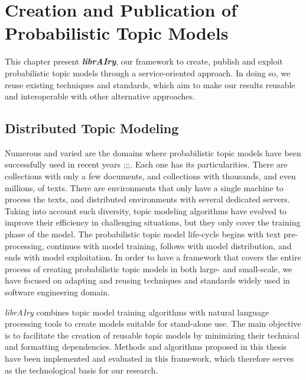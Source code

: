 

\chapter{Creation and Publication of Probabilistic Topic Models}\label{ch:scalability}

\graphicspath{{scalability/figures/}}


This chapter present \textit{\textbf{librAIry}}, our framework to create, publish and exploit probabilistic topic models through a service-oriented approach. In doing so, we reuse existing techniques and standards, which aim to make our results reusable and interoperable with other alternative approaches.


\section{Distributed Topic Modeling}


Numerous and varied are the domains where probabilistic topic models have been successfully used in recent years \citep{TapiNzali2017};\citep{ONeill2017};\citep{Greene2016};\citep{He2017}. Each one has its particularities. There are collections with only a few documents, and collections with thousands, and even millions, of texts. There are environments that only have a single machine to process the texts, and distributed environments with several dedicated servers. Taking into account such diversity, topic modeling algorithms have evolved to improve their efficiency in challenging situations, but they only cover the training phase of the model. The probabilistic topic model life-cycle begins with text pre-processing, continues with model training, follows with model distribution, and ends with model exploitation. In order to have a framework that covers the entire process of creating probabilistic topic models in both large- and small-scale, we have focused on adapting and reusing techniques and standards widely used in software engineering domain. 

\textit{librAIry} combines topic model training algorithms with natural language processing tools to  create models suitable for stand-alone use. The main objective is to facilitate the creation of reusable topic models by minimizing their technical and formatting dependencies. Methods and algorithms proposed in this thesis have been implemented and evaluated in this framework, which therefore serves as the technological basis for our research.

